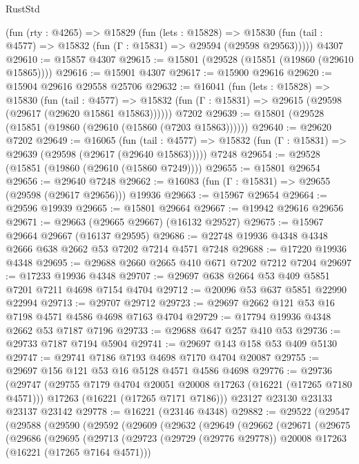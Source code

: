 \begin{lexlean}{RustStd}
\begin{coremodule}
    (fun (rty : @4265) =>
    @15829
      (fun (lets : @15828) =>
      @15830 (fun (tail : @4577) => @15832 (fun (Γ : @15831) => @29594 (@29598 @29563)))))
    @4307
@29610 := @15857 @4307
@29615 := @15801 (@29528 (@15851 (@19860 (@29610 @15865))))
@29616 := @15901 @4307
@29617 := @15900 @29616
@29620 := @15904 @29616 @29558 @25706
@29632 := @16041
    (fun (lets : @15828) =>
    @15830
      (fun (tail : @4577) =>
      @15832 (fun (Γ : @15831) => @29615 (@29598 (@29617 (@29620 @15861 @15863))))))
    @7202
@29639 := @15801 (@29528 (@15851 (@19860 (@29610 (@15860 (@7203 @15863))))))
@29640 := @29620 @7202
@29649 := @16065
    (fun (tail : @4577) => @15832 (fun (Γ : @15831) => @29639 (@29598 (@29617 (@29640 @15863)))))
    @7248
@29654 := @29528 (@15851 (@19860 (@29610 (@15860 @7249))))
@29655 := @15801 @29654
@29656 := @29640 @7248
@29662 := @16083 (fun (Γ : @15831) => @29655 (@29598 (@29617 @29656))) @19936
@29663 := @15967 @29654
@29664 := @29596 @19939
@29665 := @15801 @29664
@29667 := @19942 @29616 @29656
@29671 := @29663 (@29665 @29667) (@16132 @29527)
@29675 := @15967 @29664 @29667 (@16137 @29595)
@29686 := @22748 @19936 @4348 @4348 @2666 @638 @2662 @53 @7202 @7214 @4571 @7248
@29688 := @17220 @19936 @4348
@29695 := @29688 @2660 @2665 @410 @671 @7202 @7212 @7204
@29697 := @17233 @19936 @4348
@29707 := @29697 @638 @2664 @53 @409 @5851 @7201 @7211 @4698 @7154 @4704
@29712 := @20096 @53 @637 @5851 @22990 @22994
@29713 := @29707 @29712
@29723 := @29697 @2662 @121 @53 @16 @7198 @4571 @4586 @4698 @7163 @4704
@29729 := @17794 @19936 @4348 @2662 @53 @7187 @7196
@29733 := @29688 @647 @257 @410 @53
@29736 := @29733 @7187 @7194 @5904
@29741 := @29697 @143 @158 @53 @409 @5130
@29747 := @29741 @7186 @7193 @4698 @7170 @4704 @20087
@29755 := @29697 @156 @121 @53 @16 @5128 @4571 @4586 @4698
@29776 := @29736
    (@29747
      (@29755 @7179 @4704 @20051 @20008 @17263 (@16221 (@17265 @7180 @4571)))
      @17263
      (@16221 (@17265 @7171 @7186)))
    @23127
    @23130
    @23133
    @23137
    @23142
@29778 := @16221 (@23146 @4348)
@29882 := @29522
    (@29547
      (@29588
        (@29590
          (@29592
            (@29609
              (@29632
                (@29649
                  (@29662
                    (@29671
                      (@29675
                        (@29686
                          (@29695
                            (@29713
                              (@29723
                                (@29729 (@29776 @29778))
                                @20008
                                @17263
                                (@16221 (@17265 @7164 @4571)))

\end{coremodule}
\end{lexlean}
